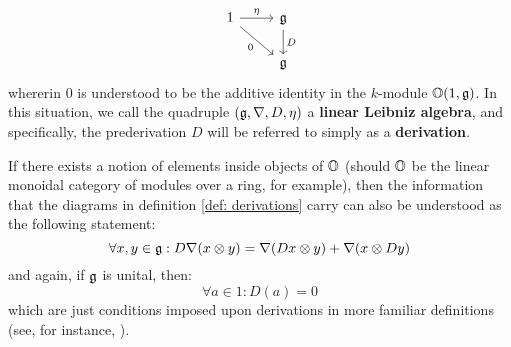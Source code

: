 \begin{definition}
\begin{enumerate}
$$\begin{tikzcd}
                                    	{1} & {\g} \\
                                    	& {\g}
                                    	\arrow["{D}", from=1-2, to=2-2]
                                    	\arrow["{\eta}", from=1-1, to=1-2]
                                    	\arrow["{0}"', from=1-1, to=2-2]
                                    \end{tikzcd}
                                $$
                            whererin $0$ is understood to be the additive identity in the $k$-module $\mathbb{O}(1, \mathfrak{g})$. In this situation, we call the quadruple $(\mathfrak{g}, \nabla, D, \eta)$ a \textbf{linear Leibniz algebra}, and specifically, the prederivation $D$ will be referred to simply as a \textbf{derivation}.
                        \end{enumerate}
                \end{definition}
                \begin{remark}
                    If there exists a notion of elements inside objects of $\mathbb{O}$ (should $\mathbb{O}$ be the linear monoidal category of modules over a ring, for example), then the information that the diagrams in definition \ref{def: derivations} carry can also be understood as the following statement:
                        $$\forall x, y \in \g: D \nabla(x \tensor y) = \nabla(Dx \tensor y) + \nabla(x \tensor Dy)$$
                    and again, if $\mathfrak{g}$ is unital, then:
                        $$\forall a \in 1: D(a) = 0$$
                    which are just conditions imposed upon derivations in more familiar definitions (see, for instance, \cite[\href{https://stacks.math.columbia.edu/tag/00RN}{Tag 00RN}]{stacks}). 
                \end{remark}
                
